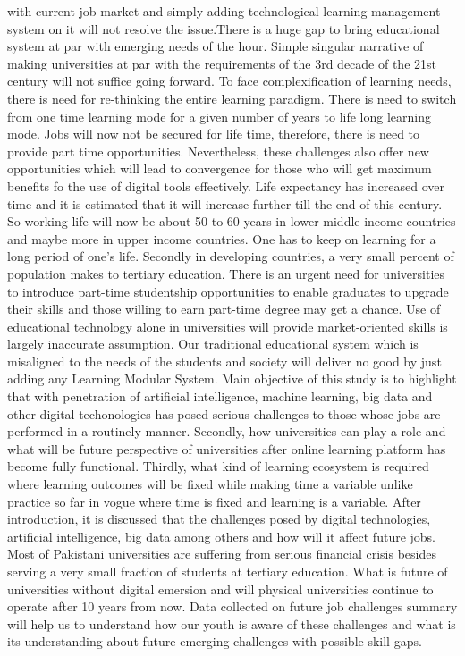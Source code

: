 \documentclass[]{elsarticle} %
\begin{document}
with current job market and simply adding technological learning
management system on it will not resolve the issue.There is a huge gap
to bring educational system at par with emerging needs of the hour.
Simple singular narrative of making universities at par with the
requirements of the 3rd decade of the 21st century will not suffice
going forward. To face complexification of learning needs, there is need
for re-thinking the entire learning paradigm. There is need to switch
from one time learning mode for a given number of years to life long
learning mode. Jobs will now not be secured for life time, therefore,
there is need to provide part time opportunities. Nevertheless, these
challenges also offer new opportunities which will lead to convergence
for those who will get maximum benefits fo the use of digital tools
effectively. Life expectancy has increased over time and it is estimated
that it will increase further till the end of this century. So working
life will now be about 50 to 60 years in lower middle income countries
and maybe more in upper income countries. One has to keep on learning
for a long period of one's life. Secondly in developing countries, a
very small percent of population makes to tertiary education. There is
an urgent need for universities to introduce part-time studentship
opportunities to enable graduates to upgrade their skills and those
willing to earn part-time degree may get a chance. Use of educational
technology alone in universities will provide market-oriented skills is
largely inaccurate assumption. Our traditional educational system which
is misaligned to the needs of the students and society will deliver no
good by just adding any Learning Modular System. Main objective of this
study is to highlight that with penetration of artificial intelligence,
machine learning, big data and other digital techonologies has posed
serious challenges to those whose jobs are performed in a routinely
manner. Secondly, how universities can play a role and what will be
future perspective of universities after online learning platform has
become fully functional. Thirdly, what kind of learning ecosystem is
required where learning outcomes will be fixed while making time a
variable unlike practice so far in vogue where time is fixed and
learning is a variable. After introduction, it is discussed that the
challenges posed by digital technologies, artificial intelligence, big
data among others and how will it affect future jobs. Most of Pakistani
universities are suffering from serious financial crisis besides serving
a very small fraction of students at tertiary education. What is future
of universities without digital emersion and will physical universities
continue to operate after 10 years from now. Data collected on future
job challenges summary will help us to understand how our youth is aware
of these challenges and what is its understanding about future emerging
challenges with possible skill gaps.
\end{document}

